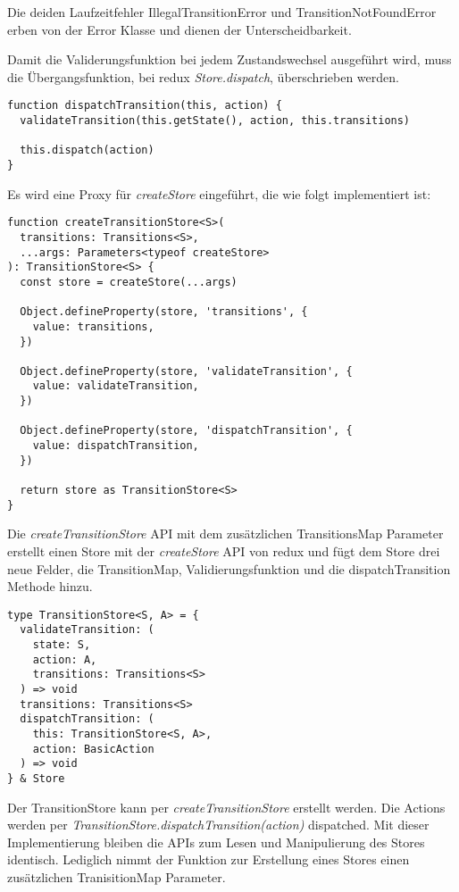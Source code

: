 Die deiden Laufzeitfehler IllegalTransitionError und TransitionNotFoundError erben von der Error Klasse und dienen der Unterscheidbarkeit.

Damit die Validerungsfunktion bei jedem Zustandswechsel ausgeführt wird, muss die Übergangsfunktion, bei redux \textit{Store.dispatch}, überschrieben werden.

\begin{lstlisting}
function dispatchTransition(this, action) {
  validateTransition(this.getState(), action, this.transitions)
  
  this.dispatch(action)
}
\end{lstlisting}

Es wird eine Proxy für \textit{createStore} eingeführt, die wie folgt implementiert ist:

\begin{lstlisting}
function createTransitionStore<S>(
  transitions: Transitions<S>,
  ...args: Parameters<typeof createStore>
): TransitionStore<S> {
  const store = createStore(...args)
  
  Object.defineProperty(store, 'transitions', {
    value: transitions,
  })
  
  Object.defineProperty(store, 'validateTransition', {
    value: validateTransition,
  })
  
  Object.defineProperty(store, 'dispatchTransition', {
    value: dispatchTransition,
  })
  
  return store as TransitionStore<S>
}
\end{lstlisting}

Die \textit{createTransitionStore} API mit dem zusätzlichen TransitionsMap Parameter erstellt einen Store mit der \textit{createStore} API von redux und fügt dem Store drei neue Felder, die TransitionMap, Validierungsfunktion und die dispatchTransition Methode hinzu.

\begin{lstlisting}
type TransitionStore<S, A> = {
  validateTransition: (
    state: S,
    action: A,
    transitions: Transitions<S>
  ) => void
  transitions: Transitions<S>
  dispatchTransition: (
    this: TransitionStore<S, A>,
    action: BasicAction
  ) => void
} & Store  
\end{lstlisting}

Der TransitionStore kann per \textit{createTransitionStore} erstellt werden. Die Actions werden per \textit{TransitionStore.dispatchTransition(action)} dispatched. Mit dieser Implementierung bleiben die APIs zum Lesen und Manipulierung des Stores identisch. Lediglich nimmt der Funktion zur Erstellung eines Stores einen zusätzlichen TranisitionMap Parameter.

